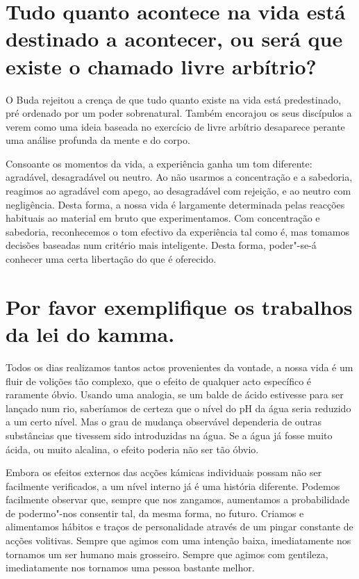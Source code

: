 \section{Tudo quanto acontece na vida está destinado a acontecer, ou será que
  existe o chamado livre arbítrio?}

O Buda rejeitou a crença de que tudo quanto existe na vida está
predestinado, pré ordenado por um poder sobrenatural. Também encorajou
os seus discípulos a verem como uma ideia baseada no exercício de livre
arbítrio desaparece perante uma análise profunda da mente e do corpo.

Consoante os momentos da vida, a experiência ganha um tom diferente:
agradável, desagradável ou neutro. Ao não usarmos a concentração e a
sabedoria, reagimos ao agradável com apego, ao desagradável com
rejeição, e ao neutro com negligência. Desta forma, a nossa vida é
largamente determinada pelas reacções habituais ao material em bruto que
experimentamos. Com concentração e sabedoria, reconhecemos o tom
efectivo da experiência tal como é, mas tomamos decisões baseadas num
critério mais inteligente. Desta forma, poder"-se-á conhecer uma certa
libertação do que é oferecido.

\section{Por favor exemplifique os trabalhos da lei do kamma.}

Todos os dias realizamos tantos actos provenientes da vontade, a nossa
vida é um fluir de volições tão complexo, que o efeito de qualquer acto
específico é raramente óbvio. Usando uma analogia, se um balde de ácido
estivesse para ser lançado num rio, saberíamos de certeza que o nível do
pH da água seria reduzido a um certo nível. Mas o grau de mudança
observável dependeria de outras substâncias que tivessem sido
introduzidas na água. Se a água já fosse muito ácida, ou muito alcalina,
o efeito poderia não ser tão óbvio.

Embora os efeitos externos das acções kámicas individuais possam não ser
facilmente verificados, a um nível interno já é uma história diferente.
Podemos facilmente observar que, sempre que nos zangamos, aumentamos a
probabilidade de podermo"-nos consentir tal, da mesma forma, no futuro.
Criamos e alimentamos hábitos e traços de personalidade através de um
pingar constante de acções volitivas. Sempre que agimos com uma intenção
baixa, imediatamente nos tornamos um ser humano mais grosseiro. Sempre
que agimos com gentileza, imediatamente nos tornamos uma pessoa bastante
melhor.

